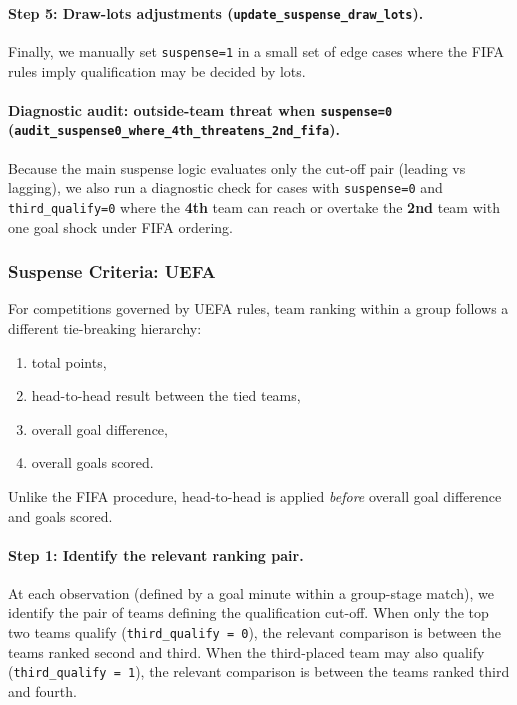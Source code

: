 \documentclass[11pt]{article}
\begin{document}
\paragraph{Step 5: Draw-lots adjustments (\texttt{update\_suspense\_draw\_lots}).}
Finally, we manually set \texttt{suspense=1} in a small set of edge cases where the FIFA rules imply qualification may be decided by lots.

\paragraph{Diagnostic audit: outside-team threat when \texttt{suspense=0} (\texttt{audit\_suspense0\_where\_4th\_threatens\_2nd\_fifa}).}
Because the main suspense logic evaluates only the cut-off pair (leading vs lagging), we also run a diagnostic check for cases with \texttt{suspense=0} and \texttt{third\_qualify=0} where the \textbf{4th} team can reach or overtake the \textbf{2nd} team with one goal shock under FIFA ordering.


\subsubsection*{Suspense Criteria: UEFA}
\label{sec:suspense-uefa-implemented}

For competitions governed by UEFA rules, team ranking within a group follows a different tie-breaking hierarchy:
\begin{enumerate}
    \item total points,
    \item head-to-head result between the tied teams,
    \item overall goal difference,
    \item overall goals scored.
\end{enumerate}
Unlike the FIFA procedure, head-to-head is applied \emph{before} overall goal difference and goals scored.

\paragraph{Step 1: Identify the relevant ranking pair.}
At each observation (defined by a goal minute within a group-stage match), we identify the pair of teams defining the qualification cut-off. When only the top two teams qualify (\texttt{third\_qualify = 0}), the relevant comparison is between the teams ranked second and third. When the third-placed team may also qualify (\texttt{third\_qualify = 1}), the relevant comparison is between the teams ranked third and fourth.
\end{document}
